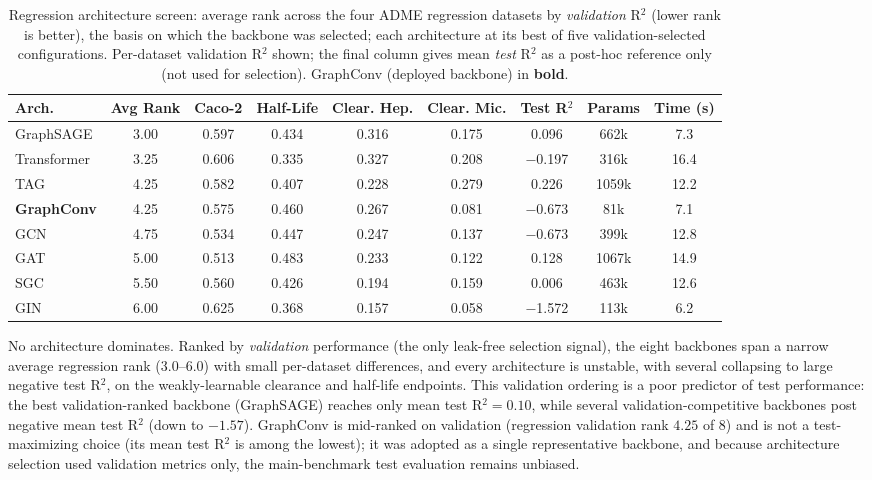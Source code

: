 \documentclass[journal,onecolumn]{IEEEtran}
\begin{document}
\begin{table}[H]
\centering
\caption{Regression architecture screen: average rank across the four ADME regression datasets by \emph{validation} R$^2$ (lower rank is better), the basis on which the backbone was selected; each architecture at its best of five validation-selected configurations. Per-dataset validation R$^2$ shown; the final column gives mean \emph{test} R$^2$ as a post-hoc reference only (not used for selection). GraphConv (deployed backbone) in \textbf{bold}.}
\label{tab:arch_regression}
\small
\setlength{\tabcolsep}{4pt}
\begin{tabular}{lcccccccc}
\toprule
\textbf{Arch.} & \textbf{Avg Rank} & \textbf{Caco-2} & \textbf{Half-Life} & \textbf{Clear. Hep.} & \textbf{Clear. Mic.} & \textbf{Test R$^2$} & \textbf{Params} & \textbf{Time (s)} \\
\midrule
GraphSAGE & 3.00 & 0.597 & 0.434 & 0.316 & 0.175 & 0.096 & 662k & 7.3 \\
Transformer & 3.25 & 0.606 & 0.335 & 0.327 & 0.208 & $-$0.197 & 316k & 16.4 \\
TAG & 4.25 & 0.582 & 0.407 & 0.228 & 0.279 & 0.226 & 1059k & 12.2 \\
\textbf{GraphConv} & 4.25 & 0.575 & 0.460 & 0.267 & 0.081 & $-$0.673 & 81k & 7.1 \\
GCN & 4.75 & 0.534 & 0.447 & 0.247 & 0.137 & $-$0.673 & 399k & 12.8 \\
GAT & 5.00 & 0.513 & 0.483 & 0.233 & 0.122 & 0.128 & 1067k & 14.9 \\
SGC & 5.50 & 0.560 & 0.426 & 0.194 & 0.159 & 0.006 & 463k & 12.6 \\
GIN & 6.00 & 0.625 & 0.368 & 0.157 & 0.058 & $-$1.572 & 113k & 6.2 \\
\bottomrule
\end{tabular}
\end{table}

No architecture dominates. Ranked by \emph{validation} performance (the only leak-free selection signal), the eight backbones span a narrow average regression rank ($3.0$--$6.0$) with small per-dataset differences, and every architecture is unstable, with several collapsing to large negative test R$^2$, on the weakly-learnable clearance and half-life endpoints. This validation ordering is a poor predictor of test performance: the best validation-ranked backbone (GraphSAGE) reaches only mean test R$^2 = 0.10$, while several validation-competitive backbones post negative mean test R$^2$ (down to $-1.57$). GraphConv is mid-ranked on validation (regression validation rank $4.25$ of $8$) and is not a test-maximizing choice (its mean test R$^2$ is among the lowest); it was adopted as a single representative backbone, and because architecture selection used validation metrics only, the main-benchmark test evaluation remains unbiased.
\end{document}
